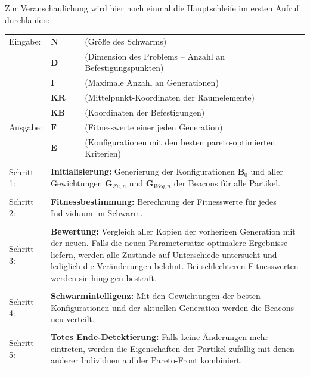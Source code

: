 Zur Veranschaulichung wird hier noch einmal die Hauptschleife im ersten Aufruf durchlaufen: \par\bigskip
\begin{tabular}[h]{lll}
	Eingabe: & $\mathbf{N}$ & (Größe des Schwarms)\\
	& $\mathbf{D}$ & (Dimension des Problems -- Anzahl an Befestigungspunkten) \\
	& $\mathbf{I}$ & (Maximale Anzahl an Generationen) \\
	& $\mathbf{KR}$ & (Mittelpunkt-Koordinaten der Raumelemente) \\
	& $\mathbf{KB}$ & (Koordinaten der Befestigungen) \\
	Ausgabe: & $\mathbf{F}$ & (Fitnesswerte einer jeden Generation) \\
	& $\mathbf{E}$ & (Konfigurationen mit den besten pareto-optimierten Kriterien) \\ \\
	Schritt 1: & \multicolumn{2}{p{13cm}}{\textbf{Initialisierung:} Generierung der Konfigurationen $\mathbf{B}_0$ und aller Gewichtungen $\mathbf{G}_{Zu,n}$ und $\mathbf{G}_{Weg,n}$ der Beacons für alle Partikel.} \\ \\
	Schritt 2: & \multicolumn{2}{p{13cm}}{\textbf{Fitnessbestimmung:} Berechnung der Fitnesswerte für jedes Individuum im Schwarm.} \\ \\
	Schritt 3: & \multicolumn{2}{p{13cm}}{\textbf{Bewertung:} Vergleich aller Kopien der vorherigen Generation mit der neuen. Falls die neuen Parametersätze optimalere Ergebnisse liefern, werden alle Zustände auf Unterschiede untersucht und lediglich die Veränderungen belohnt. Bei schlechteren Fitnesswerten werden sie hingegen bestraft.} \\ \\
	Schritt 4: & \multicolumn{2}{p{13cm}}{\textbf{Schwarmintelligenz:} Mit den Gewichtungen der besten Konfigurationen und der aktuellen Generation werden die Beacons neu verteilt.} \\ \\
	Schritt 5: & \multicolumn{2}{p{13cm}}{\textbf{Totes Ende-Detektierung:} Falls keine Änderungen mehr eintreten, werden die Eigenschaften der Partikel zufällig mit denen anderer Individuen auf der Pareto-Front kombiniert.} \\ \\
\end{tabular} 
